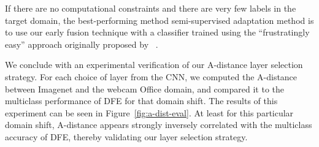 If there are no computational constraints and there are very few labels in
the target domain, the best-performing method semi-supervised adaptation method is to use our early fusion technique with a classifier trained using the ``frustratingly easy'' approach originally proposed by \daume~\cite{daume}.

We conclude with an experimental verification of our A-distance layer selection strategy.
For each choice of layer from the CNN, we computed the A-distance between Imagenet and the webcam Office domain, and compared it to the multiclass performance of DFE for that domain shift.
The results of this experiment can be seen in Figure~\ref{fig:a-dist-eval}.
At least for this particular domain shift, A-distance appears strongly inversely correlated with the multiclass accuracy of DFE, thereby validating our layer selection strategy.

